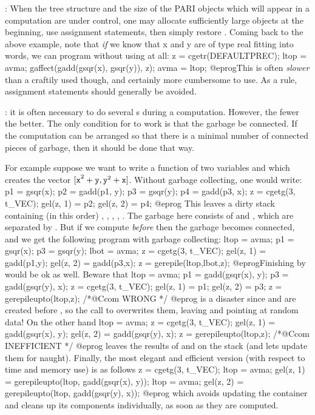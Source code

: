 : When the tree structure and
the size of the PARI objects which will appear in a computation are under
control, one may allocate sufficiently large objects at the beginning,
use assignment statements, then simply restore . Coming back to the
above example, note that \emph{if} we know that x and y are of type real
fitting into  words, we can program without using
 at all:
\bprog
  z = cgetr(DEFAULTPREC); ltop = avma;
  gaffect(gadd(gsqr(x), gsqr(y)), z);
  avma = ltop;
@eprog\noindent This is often \emph{slower} than a craftily used
 though, and certainly more cumbersome to use. As a rule,
assignment statements should generally be avoided.

: it is often necessary to do several
s during a computation. However, the fewer the better. The only
condition for  to work is that the garbage be connected. If the
computation can be arranged so that there is a minimal number of connected
pieces of garbage, then it should be done that way.

For example suppose we want to write a function of two  variables
 and  which creates the vector ${\tt [x}^2+{\tt y},
{\tt y}^2+{\tt x]}$. Without garbage collecting, one would write:
%
\bprog
  p1 = gsqr(x); p2 = gadd(p1, y);
  p3 = gsqr(y); p4 = gadd(p3, x); z = cgetg(3, t_VEC);
  gel(z, 1) = p2;
  gel(z, 2) = p4;
@eprog\noindent
This leaves a dirty stack containing (in this order) , ,
, , . The garbage here consists of  and
, which are separated by . But if we compute 
\emph{before}  then the garbage becomes connected, and we get the
following program with garbage collecting:
%
\bprog
  ltop = avma; p1 = gsqr(x); p3 = gsqr(y);
  lbot = avma; z = cgetg(3, t_VEC);
  gel(z, 1) = gadd(p1,y);
  gel(z, 2) = gadd(p3,x); z = gerepile(ltop,lbot,z);
@eprog\noindent Finishing by  would be ok as
well. Beware that
\bprog
  ltop = avma; p1 = gadd(gsqr(x), y); p3 = gadd(gsqr(y), x);
  z = cgetg(3, t_VEC);
  gel(z, 1) = p1;
  gel(z, 2) = p3; z = gerepileupto(ltop,z); /*@Ccom WRONG */
@eprog\noindent
is a disaster since  and  are created before
, so the call to  overwrites them, leaving
 and  pointing at random data! On the other
hand
\bprog
  ltop = avma; z = cgetg(3, t_VEC);
  gel(z, 1) = gadd(gsqr(x), y);
  gel(z, 2) = gadd(gsqr(y), x); z = gerepileupto(ltop,z); /*@Ccom INEFFICIENT */
@eprog\noindent
leaves the results of  and  on the stack (and
lets  update them for naught). Finally, the most elegant
and efficient version (with respect to time and memory use) is as follows
\bprog
  z = cgetg(3, t_VEC);
  ltop = avma; gel(z, 1) = gerepileupto(ltop, gadd(gsqr(x), y));
  ltop = avma; gel(z, 2) = gerepileupto(ltop, gadd(gsqr(y), x));
@eprog\noindent
which avoids updating the container  and cleans up its components
individually, as soon as they are computed.

